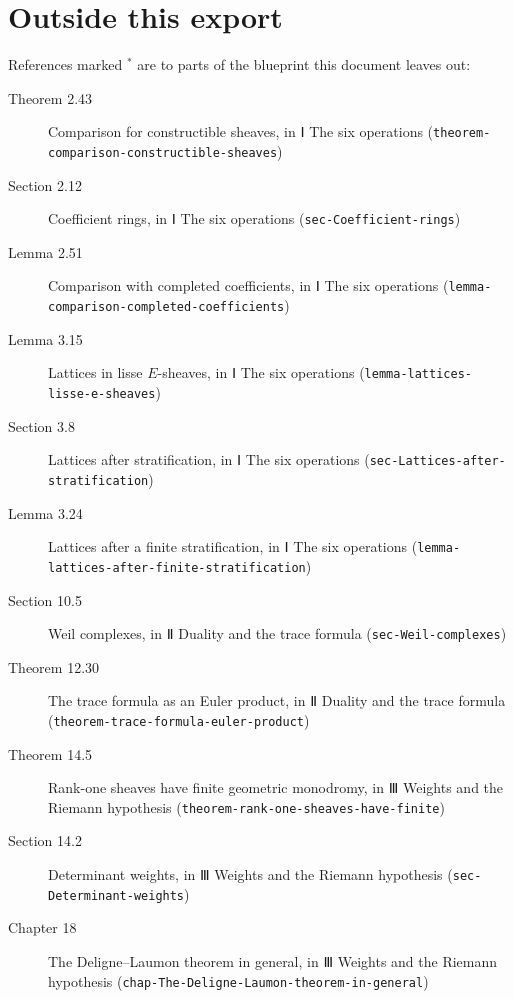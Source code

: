 \documentclass[11pt]{article}
\newcommand{\bpslug}[1]{\texttt{#1}}
\begin{document}
\clearpage{}\hypertarget{bp-outside}{}%
\section*{Outside this export}
References marked \ensuremath{{}^\ast} are to parts of the blueprint this document leaves out:
\begin{description}
\item[Theorem 2.43] Comparison for constructible sheaves, in Ⅰ The six operations (\bpslug{theorem-{}\allowbreak{}comparison-{}\allowbreak{}constructible-{}\allowbreak{}sheaves})
\item[Section 2.12] Coefficient rings, in Ⅰ The six operations (\bpslug{sec-{}\allowbreak{}Coefficient-{}\allowbreak{}rings})
\item[Lemma 2.51] Comparison with completed coefficients, in Ⅰ The six operations (\bpslug{lemma-{}\allowbreak{}comparison-{}\allowbreak{}completed-{}\allowbreak{}coefficients})
\item[Lemma 3.15] Lattices in lisse $E$-sheaves, in Ⅰ The six operations (\bpslug{lemma-{}\allowbreak{}lattices-{}\allowbreak{}lisse-{}\allowbreak{}e-{}\allowbreak{}sheaves})
\item[Section 3.8] Lattices after stratification, in Ⅰ The six operations (\bpslug{sec-{}\allowbreak{}Lattices-{}\allowbreak{}after-{}\allowbreak{}stratification})
\item[Lemma 3.24] Lattices after a finite stratification, in Ⅰ The six operations (\bpslug{lemma-{}\allowbreak{}lattices-{}\allowbreak{}after-{}\allowbreak{}finite-{}\allowbreak{}stratification})
\item[Section 10.5] Weil complexes, in Ⅱ Duality and the trace formula (\bpslug{sec-{}\allowbreak{}Weil-{}\allowbreak{}complexes})
\item[Theorem 12.30] The trace formula as an Euler product, in Ⅱ Duality and the trace formula (\bpslug{theorem-{}\allowbreak{}trace-{}\allowbreak{}formula-{}\allowbreak{}euler-{}\allowbreak{}product})
\item[Theorem 14.5] Rank-one sheaves have finite geometric monodromy, in Ⅲ Weights and the Riemann hypothesis (\bpslug{theorem-{}\allowbreak{}rank-{}\allowbreak{}one-{}\allowbreak{}sheaves-{}\allowbreak{}have-{}\allowbreak{}finite})
\item[Section 14.2] Determinant weights, in Ⅲ Weights and the Riemann hypothesis (\bpslug{sec-{}\allowbreak{}Determinant-{}\allowbreak{}weights})
\item[Chapter 18] The Deligne–Laumon theorem in general, in Ⅲ Weights and the Riemann hypothesis (\bpslug{chap-{}\allowbreak{}The-{}\allowbreak{}Deligne-{}\allowbreak{}Laumon-{}\allowbreak{}theorem-{}\allowbreak{}in-{}\allowbreak{}general})

\end{description}
\end{document}
